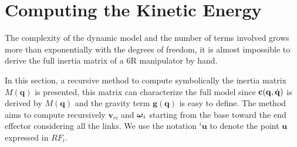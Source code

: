 \documentclass[10pt, a4paper]{report}
\newcommand{\q}{{\mathbf q}}
\begin{document}
\section{Computing the Kinetic Energy}
The complexity of the dynamic model and the number of terms involved grows more than exponentially with the degrees of freedom, it is almost impossible to derive the full inertia matrix of a 6R manipulator by hand.

In this section, a recursive method to compute symbolically the inertia matrix $M(\q)$ is presented, this matrix can characterize the full model since $\mathbf c(\q,\dq)$ is derived by $M(\q)$ and the gravity term $\mathbf g(\q)$ is easy to define. The method aims to compute recursively $\mathbf v_{ci}$ and ${\boldsymbol{\omega}}_{i}$ starting from the base toward the end effector considering all the links. We use the notation $^{i}\mathbf  u$ to denote the point $\mathbf u$ expressed in $RF_i$.
\end{document}
